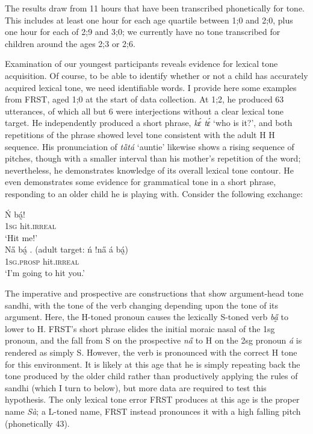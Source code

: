 \documentclass[output=paper,colorlinks,citecolor=brown,
]{langscibook}
\begin{document}
The results draw from 11 hours that have been transcribed phonetically for tone. This includes at least one hour for each age quartile between 1;0 and 2;0, plus one hour for each of 2;9 and 3;0; we currently have no tone transcribed for children around the ages 2;3 or 2;6.

Examination of our youngest participants reveals evidence for lexical tone acquisition. Of course, to be able to identify whether or not a child has accurately acquired lexical tone, we need identifiable words. I provide here some examples from FRST, aged 1;0 at the start of data collection. At 1;2, he produced 63 utterances, of which all but 6 were interjections without a clear lexical tone target. He independently produced a short phrase, \textit{kɛ́ tɛ́} `who is it?', and both repetitions of the phrase showed level tone consistent with the adult H H sequence. His pronunciation of \textit{tȁtá} `auntie' likewise shows a rising sequence of pitches, though with a smaller interval than his mother's repetition of the word; nevertheless, he demonstrates knowledge of its overall lexical tone contour. He even demonstrates some evidence for grammatical tone in a short phrase, responding to an older child he is playing with. Consider the following exchange:

\ea\label{ex:mcpherson:will-hit}
\begin{xlist}
\ex\label{ex:mcpherson:older-child}
\gll Ń bá̰! \\
\textsc{1sg} hit.\textsc{irreal}  \\
\glt `Hit me!' \\

\ex\label{ex:mcpherson:child-hit}
\gll Na̋ bá̰ . (adult target: ń !na̋ á bá̰)\\
\textsc{1sg.prosp} hit.\textsc{irreal} \\
\glt `I'm going to hit you.' \\

\end{xlist}
\z

The imperative and prospective are constructions that show argument-head tone sandhi, with the tone of the verb changing depending upon the tone of its argument. Here, the H-toned pronoun causes the lexically S-toned verb \textit{ba̰̋} to lower to H. FRST's short phrase elides the initial moraic nasal of the 1sg pronoun, and the fall from S on the prospective \textit{na̋} to H on the 2sg pronoun \textit{á} is rendered as simply S. However, the verb is pronounced with the correct H tone for this environment. It is likely at this age that he is simply repeating back the tone produced by the older child rather than productively applying the rules of sandhi (which I turn to below), but more data are required to test this hypothesis. The only lexical tone error FRST produces at this age is the proper name \textit{Sà}; a L-toned name, FRST instead pronounces it with a high falling pitch (phonetically 43). 
\end{document}
